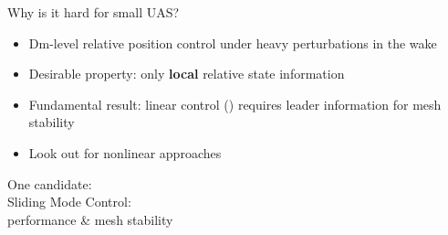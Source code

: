 \documentclass[12pt,svgnames,table,draft=false]{beamer}
\begin{document}
\usebackgroundtemplate{}


\begin{frame}{Why is it hard for small UAS?}
\centering
\vspace{-6em}
\begin{tcolorbox}[width=.99\textwidth,
colback={gray!10!},
standard jigsaw,
opacityback=1,  %
]  
\begin{itemize}
\item Dm-level relative position control under heavy perturbations in the wake 
\item Desirable property: only \textbf{local} relative state information
\item Fundamental result: linear control (\cite{shaw2007controller}) requires leader information for mesh stability \cite{Seiler2004}
\item Look out for nonlinear approaches
\end{itemize}
\end{tcolorbox}
\end{frame}

\usebackgroundtemplate{}
\begin{frame}
\centering
\Large
\vspace{3em}
\begin{center}
One candidate: \\
Sliding Mode Control:\\
performance \& mesh stability
\end{center}
\end{frame}
\end{document}

